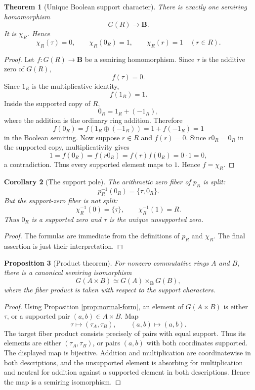 \documentclass[11pt]{article}
\newcommand{\B}{\mathbf B}
\theoremstyle{plain}
\newtheorem{theorem}{Theorem}[section]
\newtheorem{proposition}[theorem]{Proposition}
\newtheorem{corollary}[theorem]{Corollary}
\theoremstyle{definition}
\begin{document}
\begin{theorem}[Unique Boolean support character]\label{thm:unique-boolean}
There is exactly one semiring homomorphism
\[
   G(R)\longrightarrow \B.
\]
It is \(\chi_R\).  Hence
\[
   \chi_R(\tau)=0,
   \qquad
   \chi_R(0_R)=1,
   \qquad
   \chi_R(r)=1\quad(r\in R).
\]
\end{theorem}

\begin{proof}
Let \(f:G(R)\to\B\) be a semiring homomorphism.  Since \(\tau\) is the additive zero of \(G(R)\),
\[
   f(\tau)=0.
\]
Since \(1_R\) is the multiplicative identity,
\[
   f(1_R)=1.
\]
Inside the supported copy of \(R\),
\[
   0_R=1_R+(-1_R),
\]
where the addition is the ordinary ring addition.  Therefore
\[
   f(0_R)=f(1_R\oplus(-1_R))=1+f(-1_R)=1
\]
in the Boolean semiring.  Now suppose \(r\in R\) and \(f(r)=0\).  Since \(r0_R=0_R\) in the supported copy, multiplicativity gives
\[
   1=f(0_R)=f(r0_R)=f(r)f(0_R)=0\cdot 1=0,
\]
a contradiction.  Thus every supported element maps to \(1\).  Hence \(f=\chi_R\).
\end{proof}

\begin{corollary}[The support pole]\label{cor:support-pole}
The arithmetic zero fiber of \(p_R\) is split:
\[
   p_R^{-1}(0_R)=\{\tau,0_R\}.
\]
But the support-zero fiber is not split:
\[
   \chi_R^{-1}(0)=\{\tau\},
   \qquad
   \chi_R^{-1}(1)=R.
\]
Thus \(0_R\) is a supported zero and \(\tau\) is the unique unsupported zero.
\end{corollary}

\begin{proof}
The formulas are immediate from the definitions of \(p_R\) and \(\chi_R\).  The final assertion is just their interpretation.
\end{proof}

\begin{proposition}[Product theorem]\label{prop:product}
For nonzero commutative rings \(A\) and \(B\), there is a canonical semiring isomorphism
\[
   G(A\times B)\simeq G(A)\times_{\B}G(B),
\]
where the fiber product is taken with respect to the support characters.
\end{proposition}

\begin{proof}
Using Proposition \ref{prop:normal-form}, an element of \(G(A\times B)\) is either \(\tau\), or a supported pair \((a,b)\in A\times B\).  Map
\[
   \tau\longmapsto (\tau_A,\tau_B),
   \qquad
   (a,b)\longmapsto (a,b).
\]
The target fiber product consists precisely of pairs with equal support.  Thus its elements are either \((\tau_A,\tau_B)\), or pairs \((a,b)\) with both coordinates supported.  The displayed map is bijective.  Addition and multiplication are coordinatewise in both descriptions, and the unsupported element is absorbing for multiplication and neutral for addition against a supported element in both descriptions.  Hence the map is a semiring isomorphism.

\end{proof}
\end{document}
